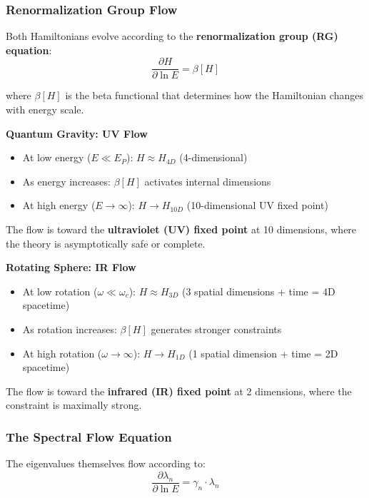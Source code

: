 \documentclass[12pt,a4paper]{article}
\begin{document}
\subsubsection{Renormalization Group Flow}

Both Hamiltonians evolve according to the \textbf{renormalization group (RG) equation}:
\begin{equation}
    \frac{\partial H}{\partial \ln E} = \beta[H]
\end{equation}

where $\beta[H]$ is the beta functional that determines how the Hamiltonian changes with energy scale.

\textbf{Quantum Gravity: UV Flow}
\begin{itemize}
    \item At low energy ($E \ll E_P$): $H \approx H_{4D}$ (4-dimensional)
    \item As energy increases: $\beta[H]$ activates internal dimensions
    \item At high energy ($E \to \infty$): $H \to H_{10D}$ (10-dimensional UV fixed point)
\end{itemize}

The flow is toward the \textbf{ultraviolet (UV) fixed point} at 10 dimensions, where the theory is asymptotically safe or complete.

\textbf{Rotating Sphere: IR Flow}
\begin{itemize}
    \item At low rotation ($\omega \ll \omega_c$): $H \approx H_{3D}$ (3 spatial dimensions + time = 4D spacetime)
    \item As rotation increases: $\beta[H]$ generates stronger constraints
    \item At high rotation ($\omega \to \infty$): $H \to H_{1D}$ (1 spatial dimension + time = 2D spacetime)
\end{itemize}

The flow is toward the \textbf{infrared (IR) fixed point} at 2 dimensions, where the constraint is maximally strong.

\subsubsection{The Spectral Flow Equation}

The eigenvalues themselves flow according to:
\begin{equation}
    \frac{\partial \lambda_n}{\partial \ln E} = \gamma_n \cdot \lambda_n
\end{equation}
\end{document}
